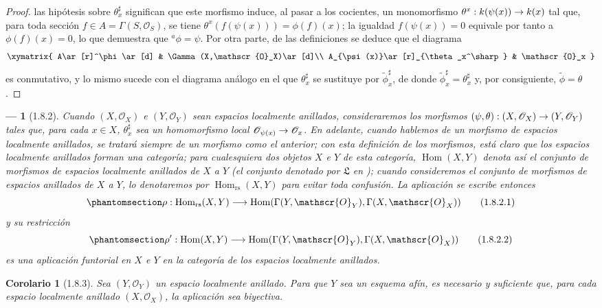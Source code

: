 \documentclass[oneside]{amsart}
\theoremstyle{ega-env-style}
\newtheorem*{env}{---}
\theoremstyle{ega-thm-env-style}
\newtheorem*{corollary}{Corolario}
\theoremstyle{ega-defn-env-style}
\def\mathcal{\mathscr}
\def\sh{\mathcal}                   %
\def\vphi{\phi}                     %
\def\kres{k}                        %
\def\Hom{\operatorname{Hom}}
\renewcommand{\to}{\mathchoice{\longrightarrow}{\rightarrow}{\rightarrow}{\rightarrow}}
\newcommand{\oldpage}[2][]{{\marginnote{\normalfont{\textbf{#1}~|~#2}}}\ignorespaces}
\let\EGAOriginalLabel\label
\renewcommand{\label}[1]{\phantomsection\EGAOriginalLabel{#1}}
\begin{document}
\begin{proof}
las hipótesis sobre $\theta_x^\sharp$ significan que este morfismo induce, al pasar a los cocientes, un monomorfismo $\theta^x:\kres(\psi(x))\to\kres(x)$ tal que, para toda sección $f\in A=\Gamma(S,\sh{O}_S)$, se tiene $\theta^x(f(\psi(x)))=\vphi(f)(x)$;
la igualdad $f(\psi(x))=0$ equivale por tanto a $\vphi(f)(x)=0$, lo que demuestra que ${}^a\vphi=\psi$.
Por otra parte, de las definiciones se deduce que el diagrama
\[
  \xymatrix{
    A\ar[r]^\vphi\ar[d] &
    \Gamma(X,\sh{O}_X)\ar[d]\\
    A_{\psi(x)}\ar[r]_{\theta_x^\sharp} &
    \sh{O}_x
  }
\]
es conmutativo, y lo mismo sucede con el diagrama análogo en el que $\theta_x^\sharp$ se sustituye por $\widetilde{\vphi}_x^\sharp$, de donde $\widetilde{\vphi}_x^\sharp=\theta_x^\sharp$  y, por consiguiente, $\widetilde{\vphi}=\theta$.
\end{proof}

\begin{env}[1.8.2]
\label{I.1.8.2}
Cuando $(X,\sh{O}_X)$ e $(Y,\sh{O}_Y)$ sean espacios \emph{localmente} anillados, consideraremos los morfismos $(\psi,\theta):(X,\sh{O}_X)\to(Y,\sh{O}_Y)$ tales que, para cada $x\in X$, $\theta_x^\sharp$ sea un homomorfismo \emph{local} $\sh{O}_{\psi(x)}\to\sh{O}_x$.
En adelante, cuando hablemos
\oldpage[II]{219}
de un \emph{morfismo de espacios localmente anillados}, se tratará siempre de un morfismo como el anterior;
con esta definición de los morfismos, está claro que los espacios localmente anillados forman una \emph{categoría};
para cualesquiera dos objetos $X$ e $Y$ de esta categoría, $\Hom(X,Y)$ denota así el conjunto de morfismos de espacios localmente anillados de $X$ a $Y$ (el conjunto denotado por $\mathfrak{L}$ en );
cuando consideremos el conjunto de \emph{morfismos de espacios anillados} de $X$ a $Y$, lo denotaremos por $\Hom_\text{rs}(X,Y)$ para evitar toda confusión.
La aplicación  se escribe entonces
\[
  \label{I.1.8.2.1}
  \rho:\Hom_\text{rs}(X,Y)\to\Hom(\Gamma(Y,\sh{O}_Y),\Gamma(X,\sh{O}_X))
  \tag{1.8.2.1}
\]
y su restricción
\[
  \label{I.1.8.2.2}
  \rho':\Hom(X,Y)\to\Hom(\Gamma(Y,\sh{O}_Y),\Gamma(X,\sh{O}_X))
  \tag{1.8.2.2}
\]
es una aplicación \emph{funtorial} en $X$ e $Y$ en la categoría de los espacios localmente anillados.
\end{env}

\begin{corollary}[1.8.3]
\label{I.1.8.3}
Sea $(Y,\sh{O}_Y)$ un espacio localmente anillado.
Para que $Y$ sea un esquema afín, es necesario y suficiente que, para cada espacio localmente anillado $(X,\sh{O}_X)$, la aplicación  sea biyectiva.
\end{corollary}
\end{document}
